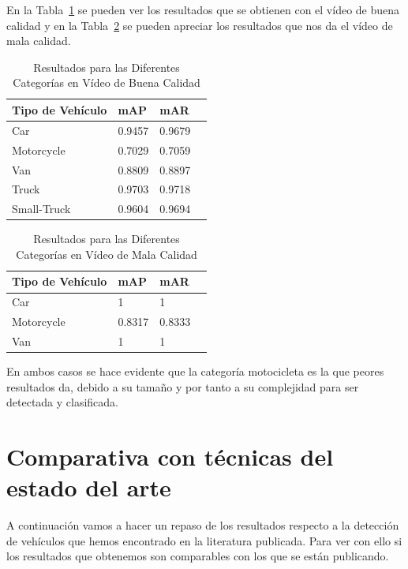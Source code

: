 En la Tabla~\ref{resultados_categoria_video_buena_calidad} se pueden ver los resultados que se obtienen con el vídeo de buena calidad y en la Tabla~\ref{resultados_categoria_video_mala_calidad} se pueden apreciar los resultados que nos da el vídeo de mala calidad.

\begin{table}[H] 
\begin{center}
\begin{tabular}{|l|l|l|l|}
\hline
Tipo de Vehículo & mAP & mAR  \\ 
\hline \hline
Car & 0.9457 & 0.9679 \\ \hline
Motorcycle & 0.7029 & 0.7059 \\ \hline
Van & 0.8809 & 0.8897\\ \hline
Truck & 0.9703 & 0.9718\\ \hline
Small-Truck & 0.9604 & 0.9694\\ \hline
\end{tabular}
\caption{Resultados para las Diferentes Categorías en Vídeo de Buena Calidad}
\label{resultados_categoria_video_buena_calidad}
\end{center}
\end{table}

\begin{table}[H] 
\begin{center}
\begin{tabular}{|l|l|l|l|}
\hline
Tipo de Vehículo & mAP & mAR  \\ 
\hline \hline
Car & 1 & 1 \\ \hline
Motorcycle & 0.8317 & 0.8333 \\ \hline
Van & 1 & 1 \\ \hline
\end{tabular}
\caption{Resultados para las Diferentes Categorías en Vídeo de Mala Calidad}
\label{resultados_categoria_video_mala_calidad}
\end{center}
\end{table}

En ambos casos se hace evidente que la categoría motocicleta es la que peores resultados da, debido a su tamaño y por tanto a su complejidad para ser detectada y clasificada.


\section{Comparativa con técnicas del estado del arte}

A continuación vamos a hacer un repaso de los resultados respecto a la detección de vehículos que hemos encontrado en la literatura publicada. Para ver con ello si los resultados que obtenemos son comparables con los que se están publicando.

